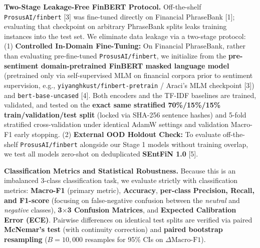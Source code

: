 \documentclass[11pt,a4paper]{article}
\begin{document}
\textbf{Two-Stage Leakage-Free FinBERT Protocol.} Off-the-shelf \texttt{ProsusAI/finbert} [3] was fine-tuned directly on Financial PhraseBank [1]; evaluating that checkpoint on arbitrary PhraseBank splits leaks training instances into the test set. We eliminate data leakage via a two-stage protocol: (1) \textbf{Controlled In-Domain Fine-Tuning:} On Financial PhraseBank, rather than evaluating pre-fine-tuned \texttt{ProsusAI/finbert}, we initialize from the \textbf{pre-sentiment domain-pretrained FinBERT masked language model} (pretrained only via self-supervised MLM on financial corpora prior to sentiment supervision, e.g., \texttt{yiyanghkust/finbert-pretrain} / Araci's MLM checkpoint [3]) and \texttt{bert-base-uncased} [4]. Both encoders and the TF-IDF baselines are trained, validated, and tested on the \textbf{exact same stratified 70\%/15\%/15\% train/validation/test split} (locked via SHA-256 sentence hashes) and 5-fold stratified cross-validation under identical AdamW settings and validation Macro-F1 early stopping. (2) \textbf{External OOD Holdout Check:} To evaluate off-the-shelf \texttt{ProsusAI/finbert} alongside our Stage 1 models without training overlap, we test all models zero-shot on deduplicated \textbf{SEntFiN 1.0} [5].

\textbf{Classification Metrics and Statistical Robustness.} Because this is an imbalanced 3-class classification task, we evaluate strictly with classification metrics: \textbf{Macro-F1} (primary metric), \textbf{Accuracy}, \textbf{per-class Precision, Recall, and F1-score} (focusing on false-negative confusion between the \textit{neutral} and \textit{negative} classes), \textbf{3$\times$3 Confusion Matrices}, and \textbf{Expected Calibration Error (ECE)}. Pairwise differences on identical test splits are verified via paired \textbf{McNemar's test} (with continuity correction) and \textbf{paired bootstrap resampling} ($B = 10{,}000$ resamples for 95\% CIs on $\Delta\text{Macro-F1}$).
\end{document}
